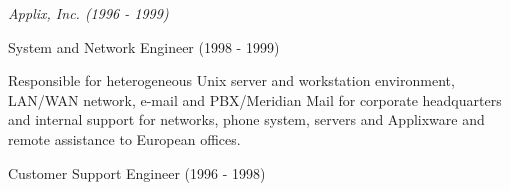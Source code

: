 \documentclass[11pt,article,oneside]{memoir}
\begin{document}
\vspace{-0.075in}

\normalsize

\bigskip
\noindent\emph{Applix, Inc. (1996 - 1999)}

\ind \footnotesize System and Network Engineer (1998 - 1999)

\ind \hspace{0.35in} \footnotesize Responsible for heterogeneous Unix server and workstation environment, LAN/WAN network, e-mail and PBX/Meridian Mail for
corporate headquarters and internal support for networks, phone system, servers and Applixware and remote assistance to European offices.

\ind \footnotesize Customer Support Engineer (1996 - 1998)

















\end{document}
